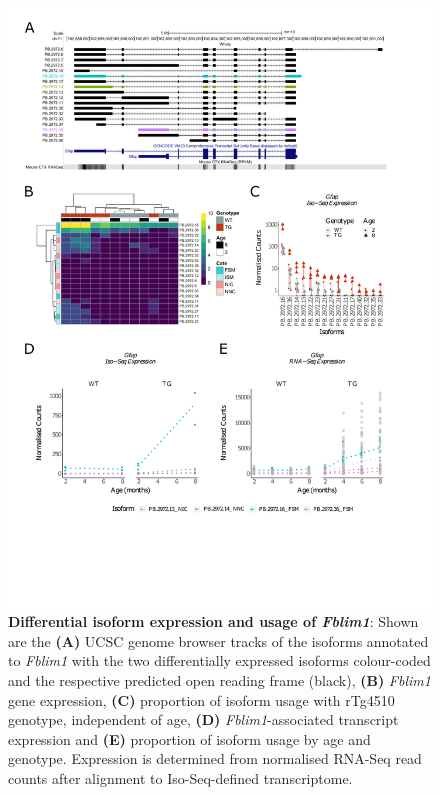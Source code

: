 \begin{figure}[!htp]
	\centering
	\includegraphics[page=6,trim={1.5cm 3cm 2cm 1cm}, scale = 0.80]{Figures/Ch5_DiffPlots.pdf}
	\captionsetup{width=0.95\textwidth}
	\caption[Differential isoform expression and usage of \textit{Fblim1}]%
	{\textbf{Differential isoform expression and usage of \textit{Fblim1}}: Shown are the \textbf{(A)} UCSC genome browser tracks of the isoforms annotated to \textit{Fblim1} with the two differentially expressed isoforms colour-coded and the respective predicted open reading frame (black), \textbf{(B)} \textit{Fblim1} gene expression, \textbf{(C)} proportion of isoform usage with rTg4510 genotype, independent of age, \textbf{(D)} \textit{Fblim1}-associated transcript expression and \textbf{(E)} proportion of isoform usage by age and genotype. Expression is determined from normalised RNA-Seq read counts after alignment to Iso-Seq-defined transcriptome.} 
	\label{fig:DIU_fblim1}
\end{figure}

